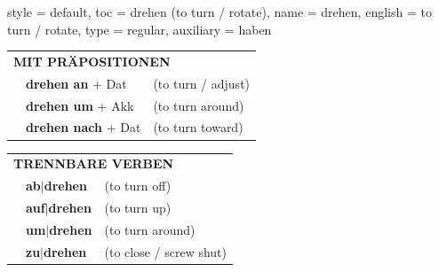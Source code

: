 \begin{verbentry}{
  style = {default},
  toc = {drehen (to turn / rotate)},
  name = {drehen},
  english = {to turn / rotate},
  type = {regular},
  auxiliary = {haben}
}
\vspace{10pt}

\begin{tabular}{lll}
\multicolumn{3}{l}{\textbf{MIT PRÄPOSITIONEN}}\\
& \textbf{drehen an} + Dat & (to turn / adjust)\\
& \textbf{drehen um} + Akk & (to turn around)\\
& \textbf{drehen nach} + Dat & (to turn toward)\\
\end{tabular}
\hfill
\begin{tabular}{lll}
\multicolumn{3}{l}{\textbf{TRENNBARE VERBEN}}\\
& \textbf{ab$|$drehen} & (to turn off)\\
& \textbf{auf$|$drehen} & (to turn up)\\
& \textbf{um$|$drehen} & (to turn around)\\
& \textbf{zu$|$drehen} & (to close / screw shut)\\
\end{tabular}
\vspace{-5pt}
\end{verbentry}

